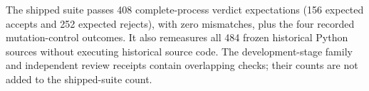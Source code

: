 The shipped suite passes 408 complete-process verdict expectations (156 expected accepts and 252 expected rejects), with zero mismatches, plus the four recorded mutation-control outcomes. It also remeasures all 484 frozen historical Python sources without executing historical source code. The development-stage family and independent review receipts contain overlapping checks; their counts are not added to the shipped-suite count.
